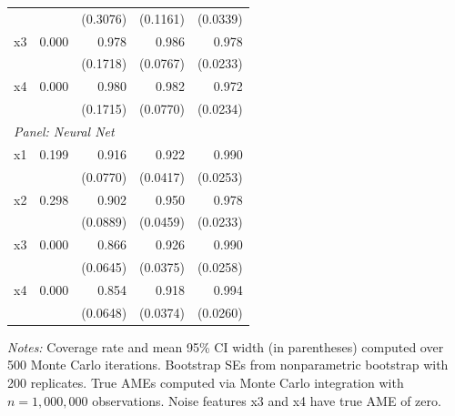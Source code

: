 \documentclass[conference]{IEEEtran}
\begin{document}
\begin{table}[htbp]
\begin{threeparttable}
\begin{tabular}{lrrrr}
				&  & (0.3076) & (0.1161) & (0.0339) \\
				\quad x3 & 0.000 & 0.978 & 0.986 & 0.978 \\
				&  & (0.1718) & (0.0767) & (0.0233) \\
				\quad x4 & 0.000 & 0.980 & 0.982 & 0.972 \\
				&  & (0.1715) & (0.0770) & (0.0234) \\
				\midrule
				\multicolumn{5}{l}{\textit{Panel: Neural Net}} \\
				\quad x1 & 0.199 & 0.916 & 0.922 & 0.990 \\
				&  & (0.0770) & (0.0417) & (0.0253) \\
				\quad x2 & 0.298 & 0.902 & 0.950 & 0.978 \\
				&  & (0.0889) & (0.0459) & (0.0233) \\
				\quad x3 & 0.000 & 0.866 & 0.926 & 0.990 \\
				&  & (0.0645) & (0.0375) & (0.0258) \\
				\quad x4 & 0.000 & 0.854 & 0.918 & 0.994 \\
				&  & (0.0648) & (0.0374) & (0.0260) \\
				\bottomrule
			\end{tabular}
			\begin{tablenotes}
				\footnotesize
				\item \textit{Notes:} Coverage rate and mean 95\% CI width (in parentheses) computed over 500 Monte Carlo iterations. Bootstrap SEs from nonparametric bootstrap with 200 replicates. True AMEs computed via Monte Carlo integration with $n=1{,}000{,}000$ observations. Noise features x3 and x4 have true AME of zero.
			\end{tablenotes}
		\end{threeparttable}
	\end{table}
	
\end{document}
